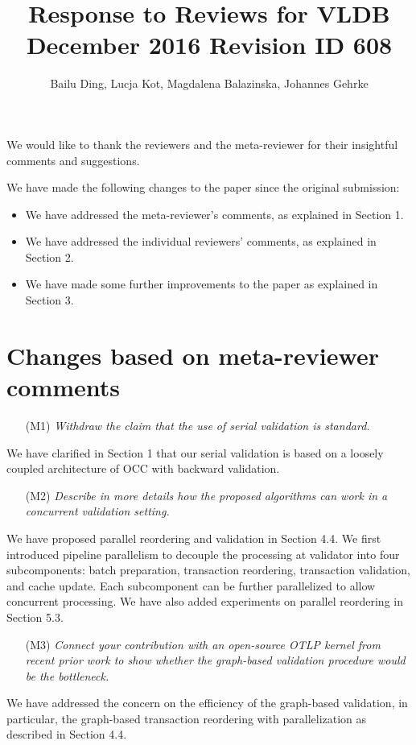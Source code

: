 \documentclass{article}
\begin{document}
\title{Response to Reviews for VLDB December 2016 Revision ID 608}
\author{Bailu Ding, Lucja Kot, Magdalena Balazinska, Johannes Gehrke}
\maketitle

We would like to thank the reviewers and the meta-reviewer for their insightful comments and suggestions. 

\bigskip

We have made the following changes to the paper since the original submission:
\begin{itemize}
\item We have addressed the meta-reviewer's comments, as explained in Section 1.
\item We have addressed the individual reviewers' comments, as explained in Section 2.
\item We have made some further improvements to the paper as explained in Section 3.
\end{itemize}

\section{Changes based on meta-reviewer comments}

\begin{itemize}
\item[(M1)] \emph{Withdraw the claim that the use of serial validation is standard. }
\end{itemize}
We have clarified in Section 1 that our serial validation is based on a loosely coupled architecture of OCC with backward validation.

\begin{itemize}
\item[(M2)] \emph{Describe in more details how the proposed algorithms can work in a concurrent validation setting. }
\end{itemize}
We have proposed parallel reordering and validation in Section 4.4. We first introduced pipeline parallelism to decouple the processing at validator into four subcomponents: batch preparation, transaction reordering, transaction validation, and cache update. Each subcomponent can be further parallelized to allow concurrent processing. We have also added experiments on parallel reordering in Section 5.3. 

\begin{itemize}
\item[(M3)]  \emph{Connect your contribution with an open-source OTLP kernel from recent prior work to show whether the graph-based validation procedure would be the bottleneck.}
\end{itemize}
We have addressed the concern on the efficiency of the graph-based validation, in particular, the graph-based transaction reordering with parallelization as described in Section 4.4. 
\end{document}
